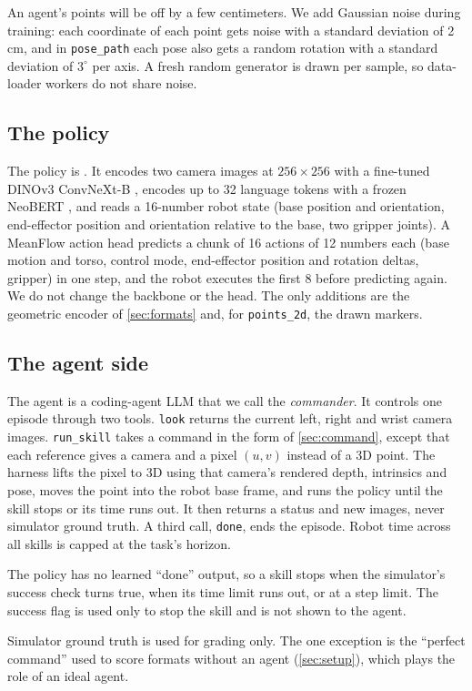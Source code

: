An agent's points will be off by a few centimeters. We add Gaussian noise
during training: each coordinate of each point gets noise with a standard
deviation of 2\,cm, and in \texttt{pose\_path} each pose also gets a random
rotation with a standard deviation of $3^\circ$ per axis. A fresh random
generator is drawn per sample, so data-loader workers do not share noise.

\subsection{The policy}
\label{sec:policy}

The policy is \dem{} \citep{sun2026dem}. It encodes two camera images at
$256\times256$ with a fine-tuned DINOv3 ConvNeXt-B \citep{simeoni2025dinov3},
encodes up to 32 language tokens with a frozen NeoBERT
\citep{lebreton2025neobert}, and reads a 16-number robot state (base position
and orientation, end-effector position and orientation relative to the base,
two gripper joints). A MeanFlow action head \citep{geng2025meanflow}
predicts a chunk of 16 actions of 12 numbers each (base motion and torso,
control mode, end-effector position and rotation deltas, gripper) in one
step, and the robot executes the first 8 before predicting again. We do not
change the backbone or the head. The only additions are the geometric
encoder of \cref{sec:formats} and, for \texttt{points\_2d}, the drawn
markers.

\subsection{The agent side}
\label{sec:agent}

The agent is a coding-agent LLM that we call the \emph{commander}. It
controls one episode through two tools. \texttt{look} returns the current
left, right and wrist camera images. \texttt{run\_skill} takes a command in
the form of \cref{sec:command}, except that each reference gives a camera
and a pixel $(u,v)$ instead of a 3D point. The harness lifts the pixel to 3D
using that camera's rendered depth, intrinsics and pose, moves the point into
the robot base frame, and runs the policy until the skill stops or its time
runs out. It then returns a status and new images, never simulator ground
truth. A third call, \texttt{done}, ends the episode. Robot time across all
skills is capped at the task's horizon.

The policy has no learned ``done'' output, so a skill stops when the
simulator's success check turns true, when its time limit runs out, or at a
step limit. The success flag is used only to stop the skill and is not shown
to the agent. 

Simulator ground truth is used for grading only. The one exception is the
``perfect command'' used to score formats without an agent
(\cref{sec:setup}), which plays the role of an ideal agent.
